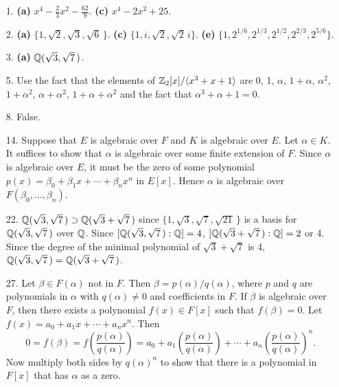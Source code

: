 {\small
\begin{itemize}
 
\bf\item[1.]\rm 
{\bf (a)} $x^4 -\frac{2}{3} x^2 - \frac{62}{9}$.
{\bf (c)} $x^4 - 2 x^2 + 25$.
 
\bf\item[2.]\rm 
{\bf (a)} $\{ 1, \sqrt{2}, \sqrt{3}, \sqrt{6}\, \}$.
{\bf (c)} $\{ 1, i, \sqrt{2}, \sqrt{2}\, i \}$.
{\bf (e)} $\{1, 2^{1/6}, 2^{1/3}, 2^{1/2}, 2^{2/3}, 2^{5/6}  \}$.
 
\bf\item[3.]\rm
{\bf (a)} ${\Bbb Q}(\sqrt{3}, \sqrt{7}\, )$.
 

\bf\item[5.]\rm
Use the fact that the elements of ${\Bbb Z}_2[x]/ \langle x^3 + x +
1\rangle$ are 0, 1, $\alpha$, $1 + \alpha$, $\alpha^2$, $1 + \alpha^2$,
$\alpha + \alpha^2$, $1 + \alpha + \alpha^2$ and the fact that
$\alpha^3 + \alpha + 1 = 0$. 


\bf\item[8.]\rm
False.


\bf\item[14.]\rm
Suppose that $E$ is algebraic over $F$ and $K$ is
algebraic over $E$. Let $\alpha \in K$. It suffices to show that
$\alpha$ is algebraic over some finite extension of $F$. Since
$\alpha$ is algebraic over $E$, it must be the zero of some polynomial
$p(x) = \beta_0 + \beta_1 x + \cdots + \beta_n x^n$ in $E[x]$. Hence
$\alpha$ is algebraic over $F(\beta_0, \ldots, \beta_n)$.


\bf\item[22.]\rm
${\Bbb Q}( \sqrt{3}, \sqrt{7}\, ) \supset {\Bbb Q}( \sqrt{3} +\sqrt{7}\,
)$ since $\{ 1, \sqrt{3}, \sqrt{7}, \sqrt{21}\, \}$ is a basis for
${\Bbb Q}( \sqrt{3}, \sqrt{7}\, )$ over ${\Bbb Q}$. Since $[{\Bbb Q}(
\sqrt{3}, \sqrt{7}\, ) : {\Bbb Q}] = 4$, $[{\Bbb Q}( \sqrt{3}
+\sqrt{7}\, ) : {\Bbb Q}] = 2$ or 4. Since the degree of the minimal
polynomial of $\sqrt{3} +\sqrt{7}$ is 4, ${\Bbb Q}( \sqrt{3},
\sqrt{7}\, ) = {\Bbb Q}( \sqrt{3} +\sqrt{7}\, )$.


\bf\item[27.]\rm
Let $\beta \in F(\alpha)$ not in $F$. Then $\beta =
p(\alpha)/q(\alpha)$, where $p$ and $q$ are polynomials in $\alpha$
with $q(\alpha) \neq 0$ and coefficients in $F$. If $\beta$ is
algebraic over $F$, then there exists a polynomial $f(x) \in F[x]$
such that $f(\beta) = 0$. Let $f(x) = a_0 + a_1 x + \cdots + a_n x^n$.
Then  
\[
0 = f(\beta) = f\left( \frac{p(\alpha)}{q(\alpha)} \right) 
= a_0 + a_1 \left( \frac{p(\alpha)}{q(\alpha)} \right)  + \cdots + a_n
\left( \frac{p(\alpha)}{q(\alpha)} \right)^n. 
\]
Now multiply both sides by $q(\alpha)^n$ to show that there is a
polynomial in $F[x]$ that has $\alpha$ as a zero.




\end{itemize}
}
 

